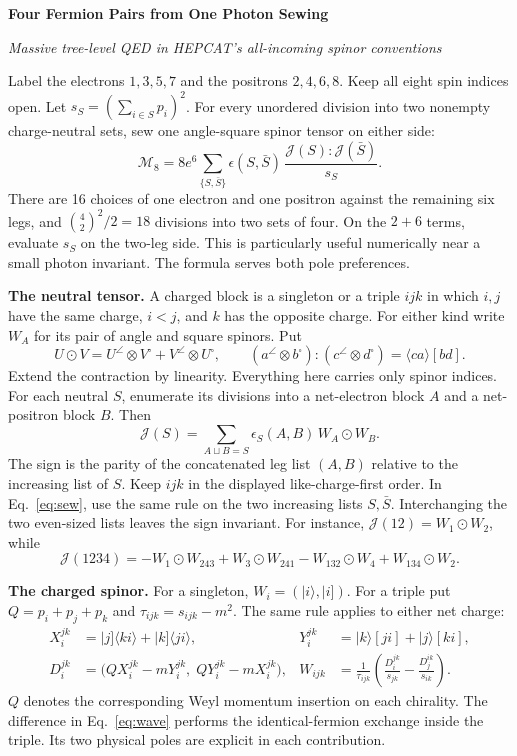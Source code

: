 \documentclass[11pt]{article}
\newcommand{\ang}[1]{\langle #1\rangle}
\newcommand{\sq}[1]{[#1]}
\newcommand{\M}{\mathcal M}
\newcommand{\J}{\mathcal J}
\begin{document}
{\LARGE\bfseries Four Fermion Pairs from One Photon Sewing}\par
\textit{Massive tree-level QED in HEPCAT's all-incoming spinor conventions}

Label the electrons $1,3,5,7$ and the positrons $2,4,6,8$. Keep all eight spin indices open.
Let $s_S=(\sum_{i\in S}p_i)^2$. For every unordered division into two nonempty
charge-neutral sets, sew one angle-square spinor tensor on either side:
\begin{equation}
 \boxed{\displaystyle
 \M_8=8e^6\sum_{\{S,\bar S\}}\epsilon(S,\bar S)\,
       \frac{\J(S):\J(\bar S)}{s_S}.}
 \label{eq:sew}
\end{equation}
There are 16 choices of one electron and one positron against the remaining six legs,
and $\binom42^2/2=18$ divisions into two sets of four.
On the $2+6$ terms, evaluate $s_S$ on the two-leg side.
This is particularly useful numerically near a small photon invariant.
The formula serves both pole preferences.

\textbf{The neutral tensor.}
A charged block is a singleton or a triple $ijk$ in which $i,j$ have the same
charge, $i<j$, and $k$ has the opposite charge. For either kind write $W_A$
for its pair of angle and square spinors. Put
\[
 U\odot V=U^\angle\otimes V^\square+V^\angle\otimes U^\square,
 \qquad
 (a^\angle\otimes b^\square):(c^\angle\otimes d^\square)
       =\ang{ca}\sq{bd}.
\]
Extend the contraction by linearity. Everything here carries only spinor indices.
For each neutral $S$, enumerate its divisions into a net-electron block $A$ and a
net-positron block $B$. Then
\[
 \J(S)=\sum_{A\sqcup B=S}\epsilon_S(A,B)\,W_A\odot W_B .
\]
The sign is the parity of the concatenated leg list $(A,B)$ relative to the
increasing list of $S$. Keep $ijk$ in the displayed like-charge-first order.
In Eq.~\eqref{eq:sew}, use the same rule on the two increasing lists $S,\bar S$.
Interchanging the two even-sized lists leaves the sign invariant.
For instance, $\J(12)=W_1\odot W_2$, while
\[
 \J(1234)=-W_1\odot W_{243}+W_3\odot W_{241}
          -W_{132}\odot W_4+W_{134}\odot W_2 .
\]

\textbf{The charged spinor.}
For a singleton, $W_i=(|i\rangle,|i])$. For a triple put $Q=p_i+p_j+p_k$ and
$\tau_{ijk}=s_{ijk}-m^2$. The same rule applies to either net charge:
\begin{align}
 X_i^{jk}&=|j]\ang{ki}+|k]\ang{ji}, &
 Y_i^{jk}&=|k\rangle[ji]+|j\rangle[ki],\nonumber\\
 D_i^{jk}&=\big(QX_i^{jk}-mY_i^{jk},\; QY_i^{jk}-mX_i^{jk}\big),&
 W_{ijk}&=\frac{1}{\tau_{ijk}}
          \left(\frac{D_i^{jk}}{s_{jk}}-\frac{D_j^{ik}}{s_{ik}}\right).
 \label{eq:wave}
\end{align}
$Q$ denotes the corresponding Weyl momentum insertion on each chirality.
The difference in Eq.~\eqref{eq:wave} performs the identical-fermion exchange
inside the triple. Its two physical poles are explicit in each contribution.
\end{document}
